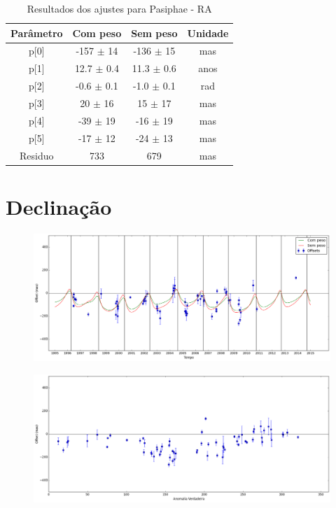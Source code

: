 \documentclass[11pt,a4paper]{report}
\begin{document}
\begin{table}[h!]
\caption{\label{Tab: Pasiphae-RA} Resultados dos ajustes para Pasiphae - RA}
\begin{centering}
\begin{tabular}{cccc}
\hline
\hline
Parâmetro & Com peso & Sem peso & Unidade\tabularnewline
\hline
p[0] & -157 $\pm$ 14 & -136 $\pm$ 15 & mas\\
p[1] & 12.7 $\pm$ 0.4 & 11.3 $\pm$ 0.6 & anos\\
p[2] & -0.6 $\pm$ 0.1 & -1.0 $\pm$ 0.1 & rad\\
p[3] & 20 $\pm$ 16 & 15 $\pm$ 17 & mas\\
p[4] & -39 $\pm$ 19 & -16 $\pm$ 19 & mas\\
p[5] & -17 $\pm$ 12 & -24 $\pm$ 13 & mas\\
Residuo & 733 & 679 & mas\\
\hline 
\end{tabular} 
\par\end{centering}
\end{table}

\section*{Declinação}

\begin{figure}[h]
\includegraphics[scale=0.35]{Pasiphae/DEC.png} 
\end{figure}

\begin{figure}[h]
\includegraphics[scale=0.35]{Pasiphae/DEC_anom.png}  
\end{figure}
\end{document}
